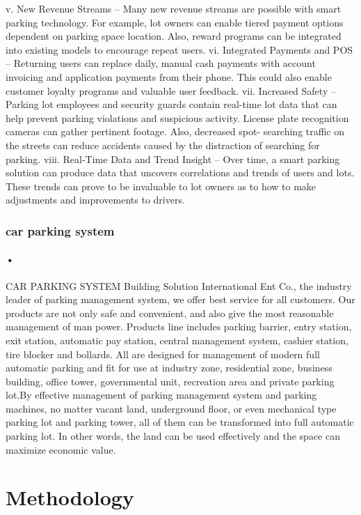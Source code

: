\documentclass[12pt]{article}
\begin{document}
v. New Revenue Streams – Many new revenue streams are possible with smart parking technology. For example, lot owners can enable tiered payment options dependent on parking space location. Also, reward programs can be integrated into existing models to encourage repeat users. 
vi. Integrated Payments and POS – Returning users can replace daily, manual cash payments with account invoicing and application payments from their phone. This could also enable customer loyalty programs and valuable user feedback. 
vii. Increased Safety – Parking lot employees and security guards contain real-time lot data that can help prevent parking violations and suspicious activity. License plate recognition cameras can gather pertinent footage. Also, decreased spot- searching traffic on the streets can reduce accidents caused by the distraction of searching for parking. 
viii. Real-Time Data and Trend Insight – Over time, a smart parking solution can produce data that uncovers correlations and trends of users and lots. These trends can prove to be invaluable to lot owners as to how to make adjustments and improvements to drivers. 
\subsubsection {car parking system}
\paragraph{•}
CAR PARKING SYSTEM
Building Solution International Ent Co., the industry leader of parking management system, we offer  best  service  for  all  customers.  Our  products  are  not  only  safe  and  convenient,  and  also  give  the  most  reasonable  management  of  man  power.  Products  line  includes  parking  barrier,  entry  station,  exit  station,  automatic  pay  station,  central  management  system,  cashier  station,  tire blocker and bollards. All are designed for management of modern full automatic parking and 
fit for use at industry zone, residential zone, business building, office tower, governmental unit, recreation area and private parking lot.By  effective  management  of  parking  management  system  and  parking  machines,  no  matter  vacant land, underground floor, or even mechanical type parking lot and parking tower, all of them  can  be  transformed  into  full  automatic  parking  lot.  In  other  words,  the  land  can  be  used  effectively and the space can maximize economic value.

\section{Methodology}
\end{document}
